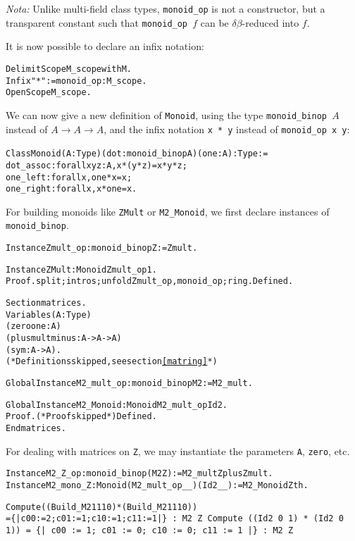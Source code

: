 \documentclass[a4]{report}
\newcommand{\arrow}{\mbox{$\rightarrow$}}
\begin{document}
\emph{Nota: }Unlike multi-field class types, \texttt{monoid\_op} is not a constructor,
but a transparent constant such that \texttt{monoid\_op $f$} can be
$\delta\beta$-reduced into $f$. 

It is now possible to declare an infix notation:
\begin{alltt}
Delimit Scope M_scope with M.
Infix "*" := monoid_op: M_scope.
Open Scope M_scope.
\end{alltt}

\label{Monoid-def}
We can now give a new definition of \texttt{Monoid}, using the type
\texttt{monoid\_binop $A$} instead of $A\arrow A \arrow A$, and the
infix notation \texttt{x * y} instead of \texttt{monoid\_op x y}:

\begin{alltt}
Class Monoid (A:Type)(dot : monoid_binop  A)(one : A) : Type := {
  dot_assoc : forall x y z : A, x * (y * z)=  x * y * z;
  one_left : forall x, one * x = x;
  one_right : forall x,  x * one = x}.
\end{alltt}

For building monoids like \texttt{ZMult} or \texttt{M2\_Monoid}, we 
first declare instances of \texttt{monoid\_binop}.

\begin{alltt}
Instance Zmult_op : monoid_binop Z := Zmult. 

Instance ZMult : Monoid Zmult_op 1.
Proof. split;intros; unfold Zmult_op, monoid_op; ring. Defined.

Section matrices. 
  Variables (A:Type)
            (zero one : A) 
            (plus mult minus : A -> A -> A)
            (sym : A -> A).
  {\color{blue}(* Definitions skipped, see section \ref{matring} *) }

  Global Instance M2_mult_op : monoid_binop M2 := M2_mult.

  Global Instance M2_Monoid : Monoid M2_mult_op Id2. 
  Proof. (* Proof skipped *) Defined.
End matrices.
\end{alltt}

For dealing with matrices on \texttt{Z}, we may instantiate the parameters
\texttt{A}, \texttt{zero}, etc.

\begin{alltt}
Instance M2_Z_op : monoid_binop (M2 Z) := M2_mult Zplus Zmult . 
Instance M2_mono_Z : Monoid (M2_mult_op _ _)  (Id2 _ _):=  M2_Monoid Zth.  

Compute ((Build_M2 1 1 1 0) * (Build_M2 1 1 1 0))%M.\it\color{red}
     = \{| c00 := 2; c01 := 1; c10 := 1; c11 := 1 |\}\tt\color{black}
     : M2 Z
Compute ((Id2 0 1) * (Id2 0 1))%M.\it\color{red}
   = \{| c00 := 1; c01 := 0; c10 := 0; c11 := 1 |\}\tt\color{black}
     : M2 Z
\end{alltt}
\end{document}
